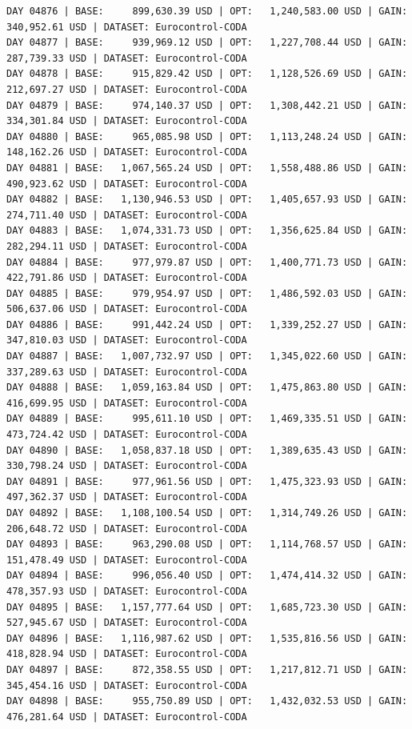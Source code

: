 \documentclass[11pt,a4paper]{article}
\begin{document}
\begin{verbatim}
DAY 04876 | BASE:     899,630.39 USD | OPT:   1,240,583.00 USD | GAIN: 340,952.61 USD | DATASET: Eurocontrol-CODA
DAY 04877 | BASE:     939,969.12 USD | OPT:   1,227,708.44 USD | GAIN: 287,739.33 USD | DATASET: Eurocontrol-CODA
DAY 04878 | BASE:     915,829.42 USD | OPT:   1,128,526.69 USD | GAIN: 212,697.27 USD | DATASET: Eurocontrol-CODA
DAY 04879 | BASE:     974,140.37 USD | OPT:   1,308,442.21 USD | GAIN: 334,301.84 USD | DATASET: Eurocontrol-CODA
DAY 04880 | BASE:     965,085.98 USD | OPT:   1,113,248.24 USD | GAIN: 148,162.26 USD | DATASET: Eurocontrol-CODA
DAY 04881 | BASE:   1,067,565.24 USD | OPT:   1,558,488.86 USD | GAIN: 490,923.62 USD | DATASET: Eurocontrol-CODA
DAY 04882 | BASE:   1,130,946.53 USD | OPT:   1,405,657.93 USD | GAIN: 274,711.40 USD | DATASET: Eurocontrol-CODA
DAY 04883 | BASE:   1,074,331.73 USD | OPT:   1,356,625.84 USD | GAIN: 282,294.11 USD | DATASET: Eurocontrol-CODA
DAY 04884 | BASE:     977,979.87 USD | OPT:   1,400,771.73 USD | GAIN: 422,791.86 USD | DATASET: Eurocontrol-CODA
DAY 04885 | BASE:     979,954.97 USD | OPT:   1,486,592.03 USD | GAIN: 506,637.06 USD | DATASET: Eurocontrol-CODA
DAY 04886 | BASE:     991,442.24 USD | OPT:   1,339,252.27 USD | GAIN: 347,810.03 USD | DATASET: Eurocontrol-CODA
DAY 04887 | BASE:   1,007,732.97 USD | OPT:   1,345,022.60 USD | GAIN: 337,289.63 USD | DATASET: Eurocontrol-CODA
DAY 04888 | BASE:   1,059,163.84 USD | OPT:   1,475,863.80 USD | GAIN: 416,699.95 USD | DATASET: Eurocontrol-CODA
DAY 04889 | BASE:     995,611.10 USD | OPT:   1,469,335.51 USD | GAIN: 473,724.42 USD | DATASET: Eurocontrol-CODA
DAY 04890 | BASE:   1,058,837.18 USD | OPT:   1,389,635.43 USD | GAIN: 330,798.24 USD | DATASET: Eurocontrol-CODA
DAY 04891 | BASE:     977,961.56 USD | OPT:   1,475,323.93 USD | GAIN: 497,362.37 USD | DATASET: Eurocontrol-CODA
DAY 04892 | BASE:   1,108,100.54 USD | OPT:   1,314,749.26 USD | GAIN: 206,648.72 USD | DATASET: Eurocontrol-CODA
DAY 04893 | BASE:     963,290.08 USD | OPT:   1,114,768.57 USD | GAIN: 151,478.49 USD | DATASET: Eurocontrol-CODA
DAY 04894 | BASE:     996,056.40 USD | OPT:   1,474,414.32 USD | GAIN: 478,357.93 USD | DATASET: Eurocontrol-CODA
DAY 04895 | BASE:   1,157,777.64 USD | OPT:   1,685,723.30 USD | GAIN: 527,945.67 USD | DATASET: Eurocontrol-CODA
DAY 04896 | BASE:   1,116,987.62 USD | OPT:   1,535,816.56 USD | GAIN: 418,828.94 USD | DATASET: Eurocontrol-CODA
DAY 04897 | BASE:     872,358.55 USD | OPT:   1,217,812.71 USD | GAIN: 345,454.16 USD | DATASET: Eurocontrol-CODA
DAY 04898 | BASE:     955,750.89 USD | OPT:   1,432,032.53 USD | GAIN: 476,281.64 USD | DATASET: Eurocontrol-CODA

\end{verbatim}
\end{document}
